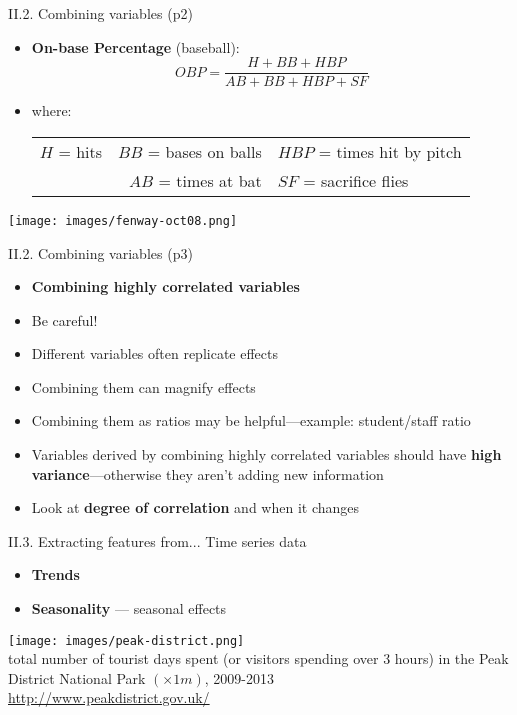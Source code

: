 \documentclass[handout]{beamer}
\newcommand{\strong}[1]{\textbf{\color{teal} #1}}
\newcommand{\stronger}[1]{\textbf{\color{purple} #1}}
\begin{document}
\begin{frame}{II.2. Combining variables (p2)}
\begin{itemize}
\item \strong{On-base Percentage} (baseball):
\[
	OBP = \frac{H + BB + HBP}{AB + BB + HBP + SF}
\]
\item[] where:
	\begin{center}
	\begin{tabular}{lll}
	$H$ = hits & $BB$ = bases on balls & $HBP$ = times hit by pitch \\
	\multicolumn{2}{r}{$AB$ = times at bat} & $SF$ = sacrifice flies \\
	\end{tabular}
	\end{center}
\end{itemize}
\begin{center}
\texttt{[image: images/fenway-oct08.png]}
\end{center}
\end{frame}
\begin{frame}{II.2. Combining variables (p3)}
\begin{itemize}
\item[] \strong{Combining highly correlated variables}
\item Be careful! 
\item Different variables often replicate effects
\item Combining them can magnify effects
\item Combining them as ratios may be helpful---example: student/staff ratio
\item Variables derived by combining highly correlated variables should have \strong{high variance}---otherwise they aren't adding new information
\item Look at \strong{degree of correlation} and when it changes
\end{itemize}
\end{frame}
\begin{frame}{II.3. Extracting features from... Time series data}
\begin{itemize}
\item \stronger{Trends}
\item \stronger{Seasonality} --- seasonal effects
\end{itemize}
\begin{center}
\texttt{[image: images/peak-district.png]}\\
\footnotesize{total number of tourist days spent (or visitors spending over 3 hours) in the Peak District National Park $(\times 1m)$, 2009-2013}\\
\tiny{\url{http://www.peakdistrict.gov.uk/}}
\end{center}
\end{frame}
\end{document}
